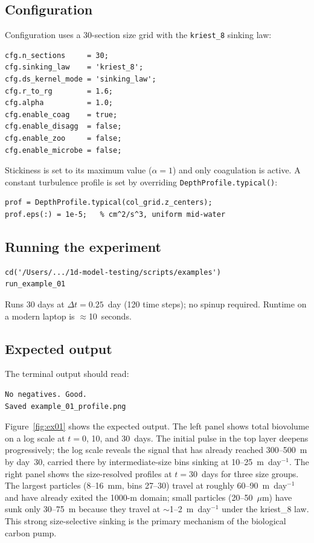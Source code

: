 \documentclass[12pt,a4paper]{report}
\numberwithin{equation}{chapter}
\begin{document}
\subsection{Configuration}

Configuration uses a 30-section size grid with the \texttt{kriest\_8}
sinking law:

\begin{lstlisting}
cfg.n_sections     = 30;
cfg.sinking_law    = 'kriest_8';
cfg.ds_kernel_mode = 'sinking_law';
cfg.r_to_rg        = 1.6;
cfg.alpha          = 1.0;
cfg.enable_coag    = true;
cfg.enable_disagg  = false;
cfg.enable_zoo     = false;
cfg.enable_microbe = false;
\end{lstlisting}

Stickiness is set to its maximum value ($\alpha = 1$) and only coagulation
is active. A constant turbulence profile is set by overriding
\texttt{DepthProfile.typical()}:

\begin{lstlisting}
prof = DepthProfile.typical(col_grid.z_centers);
prof.eps(:) = 1e-5;   % cm^2/s^3, uniform mid-water
\end{lstlisting}

\subsection{Running the experiment}

\begin{lstlisting}[numbers=none]
cd('/Users/.../1d-model-testing/scripts/examples')
run_example_01
\end{lstlisting}

Runs 30 days at $\Delta t = 0.25$~day (120 time steps); no spinup required.
Runtime on a modern laptop is $\approx$10~seconds.

\subsection{Expected output}

The terminal output should read:

\begin{verbatim}
No negatives. Good.
Saved example_01_profile.png
\end{verbatim}

Figure~\ref{fig:ex01} shows the expected output. The left panel shows total
biovolume on a log scale at $t = 0$, 10, and 30~days. The initial pulse in the
top layer deepens progressively; the log scale reveals the signal that has
already reached 300--500~m by day~30, carried there by intermediate-size bins
sinking at 10--25~m~day$^{-1}$. The right panel shows the size-resolved profiles
at $t = 30$~days for three size groups. The largest particles (8--16~mm, bins
27--30) travel at roughly 60--90~m~day$^{-1}$ and have already exited the 1000-m
domain; small particles (20--50~$\mu$m) have sunk only 30--75~m because they
travel at $\sim$1--2~m~day$^{-1}$ under the kriest\_8 law. This strong
size-selective sinking is the primary mechanism of the biological carbon pump.
\end{document}
